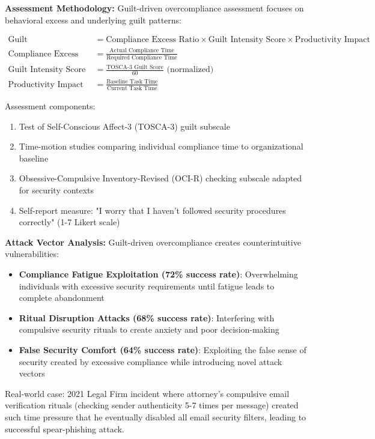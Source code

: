 \documentclass[11pt,a4paper]{article}
\begin{document}
\textbf{Assessment Methodology:}
Guilt-driven overcompliance assessment focuses on behavioral excess and underlying guilt patterns:

\begin{align}
\text{Guilt Overcompliance Index} &= \text{Compliance Excess Ratio} \times \text{Guilt Intensity Score} \times \text{Productivity Impact} \\
\text{Compliance Excess Ratio} &= \frac{\text{Actual Compliance Time}}{\text{Required Compliance Time}} \\
\text{Guilt Intensity Score} &= \frac{\text{TOSCA-3 Guilt Score}}{60} \text{ (normalized)} \\
\text{Productivity Impact} &= \frac{\text{Baseline Task Time}}{\text{Current Task Time}}
\end{align}

Assessment components:
\begin{enumerate}
\item Test of Self-Conscious Affect-3 (TOSCA-3) guilt subscale
\item Time-motion studies comparing individual compliance time to organizational baseline
\item Obsessive-Compulsive Inventory-Revised (OCI-R) checking subscale adapted for security contexts
\item Self-report measure: "I worry that I haven't followed security procedures correctly" (1-7 Likert scale)
\end{enumerate}

\textbf{Attack Vector Analysis:}
Guilt-driven overcompliance creates counterintuitive vulnerabilities:
\begin{itemize}
\item \textbf{Compliance Fatigue Exploitation (72\% success rate)}: Overwhelming individuals with excessive security requirements until fatigue leads to complete abandonment
\item \textbf{Ritual Disruption Attacks (68\% success rate)}: Interfering with compulsive security rituals to create anxiety and poor decision-making
\item \textbf{False Security Comfort (64\% success rate)}: Exploiting the false sense of security created by excessive compliance while introducing novel attack vectors
\end{itemize}

Real-world case: 2021 Legal Firm incident where attorney's compulsive email verification rituals (checking sender authenticity 5-7 times per message) created such time pressure that he eventually disabled all email security filters, leading to successful spear-phishing attack.
\end{document}
